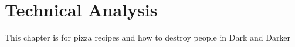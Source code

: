 \chapter{Technical Analysis} \label{ch:TechnicalAnalysis}
This chapter is for pizza recipes and how to destroy people in Dark and Darker